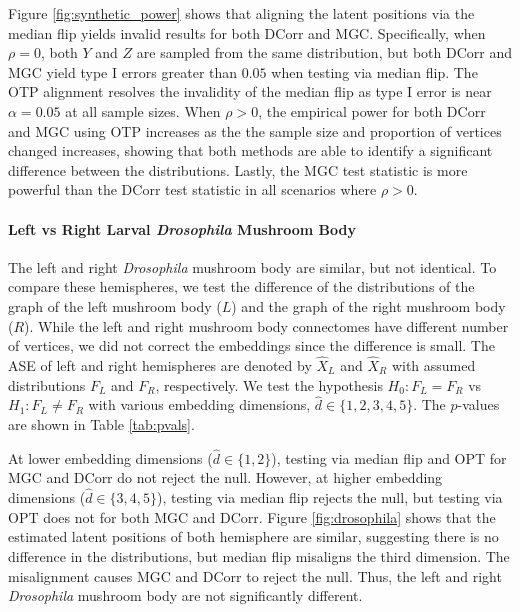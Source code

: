Figure \ref{fig:synthetic_power} shows that aligning the latent positions via the median flip yields invalid results for both DCorr and MGC. 
Specifically, when $\rho=0$, both $Y$ and $Z$ are sampled from the same distribution, but both DCorr and MGC yield type I errors  greater than $0.05$ when testing via median flip. 
The OTP alignment resolves the invalidity of the median flip as type I error is near $\alpha = 0.05$ at all sample sizes. 
When $\rho>0$, the empirical power for both DCorr and MGC using OTP increases as the the sample size and proportion of vertices changed increases, showing that both methods are able to identify a significant difference between the distributions.
Lastly, the MGC test statistic is more powerful than the DCorr test statistic in all scenarios where $\rho >0$.


\paragraph{Left vs Right Larval \textit{Drosophila} Mushroom Body}

The left and right \textit{Drosophila} mushroom body are similar, but not identical. To compare  these hemispheres, we test the difference of the distributions of the graph of the left mushroom body ($L$) and the graph of the right mushroom body ($R$).
While the left and right mushroom body connectomes have different number of vertices, we did not correct the embeddings since the difference is small.
The ASE of left and right hemispheres are denoted by $\hat{X}_L$ and $\hat{X}_R$ with assumed distributions $F_L$ and $F_R$, respectively.
We test the hypothesis $H_0: F_L = F_R$ vs $H_1: F_L \neq F_R$ with various embedding dimensions, $\hat d \in \{1, 2, 3, 4, 5\}$. The $p$-values are shown in Table \ref{tab:pvals}.

At lower embedding dimensions ($\hat d \in \{1, 2\}$), testing via median flip and OPT for MGC and DCorr do not reject the null. 
However, at higher embedding dimensions ($\hat d \in \{3, 4, 5\}$), testing via median flip rejects the null, but testing via OPT does not for both MGC and DCorr. 
Figure \ref{fig:drosophila} shows that the estimated latent positions of both hemisphere are similar, suggesting there is no difference in the distributions, but median flip misaligns the third dimension. 
The misalignment causes MGC and DCorr to reject the null. 
Thus, the left and right \textit{Drosophila} mushroom body are not significantly different.


